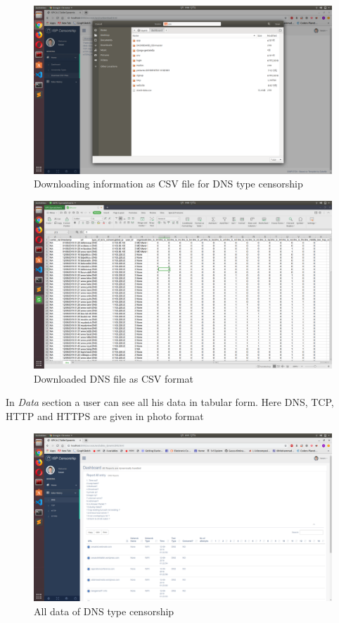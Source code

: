 \begin{figure}[h]
    \centering
    \includegraphics[width=\textwidth]{website/8download2.png}
    \caption{Downloading information as CSV file for DNS type censorship}
    \label{fig:web11}
\end{figure}

\begin{figure}[h]
    \centering
    \includegraphics[width=\textwidth]{website/8download3.png}
    \caption{Downloaded DNS file as CSV format}
    \label{fig:web12}
\end{figure}

In \emph{Data} section a user can see all his data in tabular form. Here DNS, TCP, HTTP and HTTPS are given in photo format

\begin{figure}[h]
    \centering
    \includegraphics[width=\textwidth]{website/9dnsdetails.png}
    \caption{All data of DNS type censorship}
    \label{fig:web13}
\end{figure}

